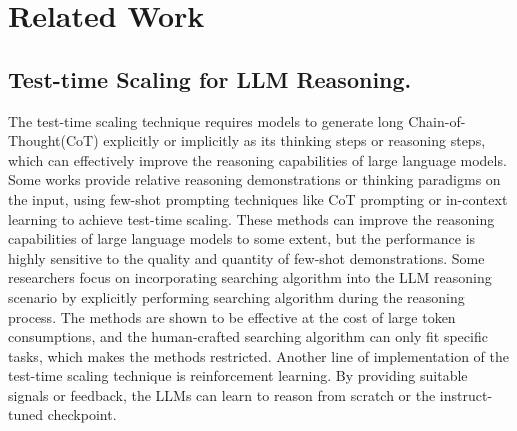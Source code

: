 \section{Related Work}
\subsection{Test-time Scaling for LLM Reasoning.}
The test-time scaling technique requires models to generate long Chain-of-Thought(CoT) explicitly or implicitly as its thinking steps or reasoning steps, which can effectively improve the reasoning capabilities of large language models. Some works provide relative reasoning demonstrations or thinking paradigms on the input, using few-shot prompting techniques like CoT prompting\citep{DBLP:conf/nips/Wei0SBIXCLZ22} or in-context learning\citep{DBLP:journals/corr/abs-2211-09066} to achieve test-time scaling. These methods can improve the reasoning capabilities of large language models to some extent, but the performance is highly sensitive to the quality and quantity of few-shot demonstrations\citep{qin-etal-2024-context}. Some researchers focus on incorporating searching algorithm into the LLM reasoning scenario by explicitly performing searching algorithm during the reasoning process\citep{DBLP:conf/nips/YaoYZS00N23,DBLP:conf/emnlp/LiuG0HZQZ23,DBLP:conf/iclr/0002WSLCNCZ23,DBLP:conf/emnlp/ZhaoXKHX23}. The methods are shown to be effective at the cost of large token consumptions, and the human-crafted searching algorithm can only fit specific tasks\citep{DBLP:journals/corr/abs-2409-12183}, which makes the methods restricted. Another line of implementation of the test-time scaling technique is reinforcement learning. By providing suitable signals or feedback, the LLMs can learn to reason from scratch\cite{deepseekai2025deepseekr1incentivizingreasoningcapability} or the instruct-tuned checkpoint\cite{DBLP:conf/nips/ZelikmanWMG22}.

